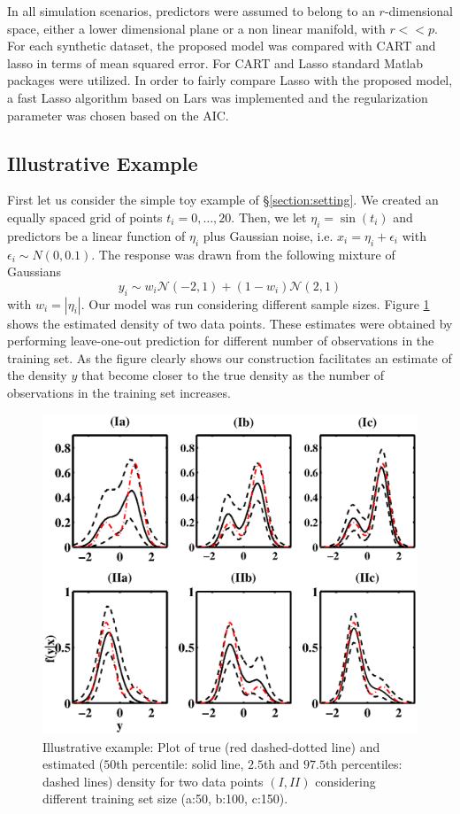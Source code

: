 \documentclass{article} %
\begin{document}
In all simulation scenarios, predictors were assumed to belong to an $r$-dimensional space, either a lower dimensional plane or a non linear manifold, with $r<<p$. For each synthetic dataset, the proposed model was compared with CART and lasso in terms of mean squared error. For CART and Lasso standard Matlab packages were utilized. In order to fairly compare Lasso with the proposed model, a fast Lasso algorithm based on Lars was implemented and the regularization parameter was chosen based on  the AIC. 

\subsection{Illustrative Example}
First let us consider the simple toy example of \S \ref{section:setting}. We created an equally spaced grid of points $t_i=0, \ldots, 20$. Then, we let $\eta_i=\sin(t_i)$ and predictors be a linear function of $\eta_i$ plus Gaussian noise, i.e. $x_i=\eta_i + \epsilon_i$ with $\epsilon_i \sim N(0,0.1)$. The response was drawn from the following mixture of Gaussians
\begin{equation}
y_i \sim w_i \mathcal{N}(-2,1) + (1-w_i) \mathcal{N}(2,1) 
\end{equation}
with $w_i=|\eta_i|$. Our model was run considering different sample sizes. Figure \ref{plotDensity} shows the estimated density of two data points. These estimates were obtained by performing leave-one-out prediction for different number of observations in the training set. As the figure clearly shows our construction facilitates an estimate of the density $y$ that become closer to the true density as the number of observations in the training set increases.




\begin{figure}[h!]
\centering
\includegraphics[width=0.8\linewidth]{densityestimate.eps}
\caption{Illustrative example: Plot of true (red dashed-dotted line) and estimated ($50$th percentile: solid line, $2.5$th and $97.5$th percentiles: dashed lines) density for two data points $(I, II)$ considering different training set size (a:50, b:100, c:150). } \label{plotDensity}
\end{figure}
\end{document}

